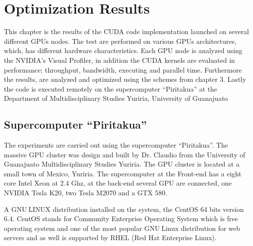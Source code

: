 
\chapter{Optimization Results} %

\label{Optimization Results} %



This chapter is the results of the CUDA code implementation launched on several different GPUs nodes. The test are performed on various GPUs architectures, which, has different hardware characteristics. Each GPU node is analyzed using the NVIDIA's Visual Profiler, in addition the CUDA kernels are evaluated in performance; throughput, bandwidth, executing and parallel time. Furthermore the results, are analyzed and optimized using the schemes from chapter 3. Lastly the code is executed remotely on the supercomputer ``Piritakua'' at the Department of Multidisciplinary Studies Yuriria, University of Guanajuato

\section{Supercomputer ``Piritakua''}

The experiments are carried out using the supercomputer “Piritakua”. The massive GPU cluster was design and built by Dr. Claudio from the University of Guanajuato Multidisciplinary Studies Yuriria. The GPU cluster is located at a small town of Mexico, Yuriria. The supercomputer at the Front-end has a eight core Intel Xeon at 2.4 Ghz, at the back-end several GPU are connected, one NVIDIA Tesla K20, two Tesla M2070 and a GTX 580.

A GNU$ \ $LINUX distribution installed on the system, the CentOS 64 bits version 6.4. CentOS stands for Community Enterprise Operating System which is free operating system and one of the most popular GNU$ \ $Linux distribution for web servers and as well is supported by RHEL (Red Hat Enterprise Linux). \cite{centos} 

